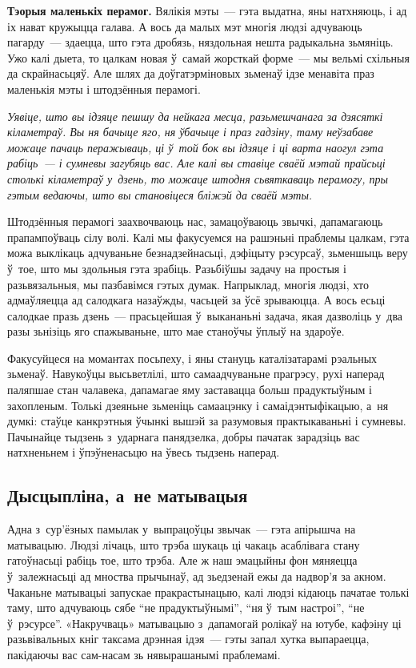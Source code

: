 \textbf{Тэорыя маленькіх перамог.} Вялікія мэты~--- гэта выдатна, яны натхняюць, і ад іх нават кружыцца галава. А вось да малых мэт многія людзі адчуваюць пагарду~--- здаецца, што гэта дробязь, няздольная нешта радыкальна зьмяніць. Ужо калі дыета, то цалкам новая ў~самай жорсткай форме~--- мы вельмі схільныя да скрайнасьцяў. Але шлях да доўгатэрміновых зьменаў ідзе менавіта праз маленькія мэты і штодзённыя перамогі.

\emph{Уявіце, што вы ідзяце пешшу да нейкага месца, разьмешчанага за дзясяткі кіламетраў. Вы ня бачыце яго, ня ўбачыце і праз гадзіну, таму неўзабаве можаце пачаць перажываць, ці ў~той бок вы ідзяце і ці варта наогул гэта рабіць~--- і сумневы загубяць вас. Але калі вы ставіце сваёй мэтай прайсьці столькі кіламетраў у~дзень, то можаце штодня сьвяткаваць перамогу, пры гэтым ведаючы, што вы становіцеся бліжэй да сваёй мэты.}

Штодзённыя перамогі заахвочваюць нас, замацоўваюць звычкі, дапамагаюць прапампоўваць сілу волі. Калі мы факусуемся на рашэньні праблемы цалкам, гэта можа выклікаць адчуваньне безнадзейнасьці, дэфіцыту рэсурсаў, зьменшыць веру ў~тое, што мы здольныя гэта зрабіць. Разьбіўшы задачу на простыя і разьвязальныя, мы пазбавімся гэтых думак. Напрыклад, многія людзі, хто адмаўляецца ад салодкага назаўжды, часьцей за ўсё зрываюцца. А вось есьці салодкае празь дзень~--- прасьцейшая ў~выкананьні задача, якая дазволіць у~два разы зьнізіць яго спажываньне, што мае станоўчы ўплыў на здароўе.


Факусуйцеся на момантах посьпеху, і яны стануць каталізатарамі рэальных зьменаў. Навукоўцы высьветлілі, што самаадчуваньне прагрэсу, рухі наперад паляпшае стан чалавека, дапамагае яму заставацца больш прадуктыўным і захопленым. Толькі дзеяньне зьменіць самаацэнку і самаідэнтыфікацыю, а~ня думкі: стаўце канкрэтныя ўчынкі вышэй за разумовыя практыкаваньні і сумневы. Пачынайце тыдзень з~ударнага панядзелка, добры пачатак зарадзіць вас натхненьнем і ўпэўненасьцю на ўвесь тыдзень наперад.

\subsection*{Дысцыпліна, а~не матывацыя}

Адна з~сур'ёзных памылак у~выпрацоўцы звычак~--- гэта апірышча на матывацыю. Людзі лічаць, што трэба шукаць ці чакаць асаблівага стану гатоўнасьці рабіць тое, што трэба. Але ж наш эмацыйны фон мяняецца ў~залежнасьці ад мноства прычынаў, ад зьедзенай ежы да надвор'я за акном. Чаканьне матывацыі запускае пракрастынацыю, калі людзі кідаюць пачатае толькі таму, што адчуваюць сябе ``не прадуктыўнымі'', ``ня ў~тым настроі'', ``не ў~рэсурсе''. «Накручваць» матывацыю з~дапамогай ролікаў на ютубе, кафэіну ці разьвівальных кніг таксама дрэнная ідэя~--- гэты запал хутка выпараецца, пакідаючы вас сам-насам зь нявырашанымі праблемамі.

